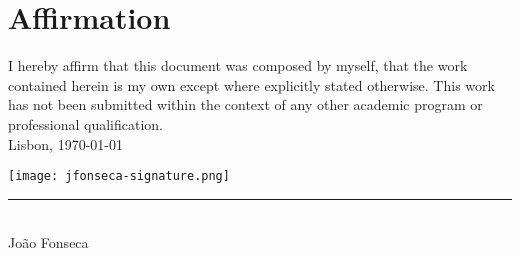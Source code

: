 \chapter*{Affirmation}

I hereby affirm that this document was composed by myself, that the work
contained herein is my own except where explicitly stated otherwise. This work
has not been submitted within the context of any other academic program or
professional qualification. \\

Lisbon, \today
\vspace{-.5cm}

\begin{minipage}{0.3\textwidth}
    \centering 
    \texttt{[image: jfonseca-signature.png]}\\
    \vspace{-1cm}
    \rule{\textwidth}{.3pt}\\
    \large{João Fonseca}
\end{minipage}
\vspace{0.3cm}


